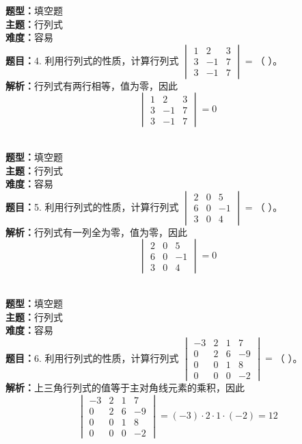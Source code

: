 \documentclass{ctexart}
\newenvironment{question}[5]{%
	\noindent\textbf{题型：}#1\\
	\textbf{主题：}#2\\
	\textbf{难度：}#3\\
	\textbf{题目：}#4\\
	\textbf{解析：}#5\\
	\vspace{1em}
}{}
\begin{document}
	\begin{question}
		{填空题}
		{行列式}
		{容易}
		{4. 利用行列式的性质，计算行列式 $\begin{vmatrix}1 & 2 & 3 \\ 3 & -1 & 7 \\ 3 & -1 & 7\end{vmatrix}=$（ ）。}
		{行列式有两行相等，值为零，因此
			$$
			\begin{vmatrix}
				1 & 2 & 3 \\
				3 & -1 & 7 \\
				3 & -1 & 7
			\end{vmatrix}=0
			$$}
	\end{question}
	
	\begin{question}
		{填空题}
		{行列式}
		{容易}
		{5. 利用行列式的性质，计算行列式 $\begin{vmatrix}2 & 0 & 5 \\ 6 & 0 & -1 \\ 3 & 0 & 4\end{vmatrix}=$（ ）。}
		{行列式有一列全为零，值为零，因此
			$$
			\begin{vmatrix}
				2 & 0 & 5 \\
				6 & 0 & -1 \\
				3 & 0 & 4
			\end{vmatrix}=0
			$$}
	\end{question}
	
	\begin{question}
		{填空题}
		{行列式}
		{容易}
		{6. 利用行列式的性质，计算行列式 $\begin{vmatrix}-3 & 2 & 1 & 7 \\ 0 & 2 & 6 & -9 \\ 0 & 0 & 1 & 8 \\ 0 & 0 & 0 & -2\end{vmatrix}=$（ ）。}
		{上三角行列式的值等于主对角线元素的乘积，因此
			$$
			\begin{vmatrix}
				-3 & 2 & 1 & 7 \\
				0 & 2 & 6 & -9 \\
				0 & 0 & 1 & 8 \\
				0 & 0 & 0 & -2
			\end{vmatrix}=(-3)\cdot2\cdot1\cdot(-2)=12
			$$}
	\end{question}
	
\end{document}
